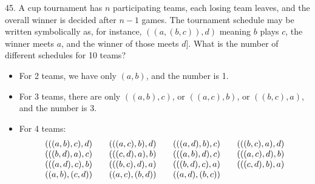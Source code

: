 \begin{problem}{45.}
	A cup tournament has $n$ participating teams, each losing team leaves, and the overall winner is decided after $n-1$ games.
	The tournament schedule may be written symbolically as, for instance,  $((a,(b,c)),d)$ meaning $b$ plays $c$, the winner meets $a$, and the winner of those meets $d$].
	What is the number of different schedules for 10 teams?
	\begin{itemize}
		\item For 2 teams, we have only $(a,b)$, and the number is 1.
		\item For 3 teams, there are only $((a,b),c)$, or $((a,c),b)$, or $((b,c),a)$, and the number is 3.
		\item For 4 teams:
			\begin{equation*}
				\begin{array}{@{}cccc@{}}
					(((a,b),c),d) & \quad\;(((a,c),b),d) & \quad\;(((a,d),b),c) & \quad\;(((b,c),a),d) \\
					(((b,d),a),c) & \quad\;(((c,d),a),b) & \quad\;(((a,b),d),c) & \quad\;(((a,c),d),b) \\
					(((a,d),c),b) & \quad\;(((b,c),d),a) & \quad\;(((b,d),c),a) & \quad\;(((c,d),b),a) \\
					((a,b),(c,d)) & \quad\;((a,c),(b,d)) & \quad\;((a,d),(b,c))
				\end{array}
			\end{equation*}
	\end{itemize}
\end{problem}

